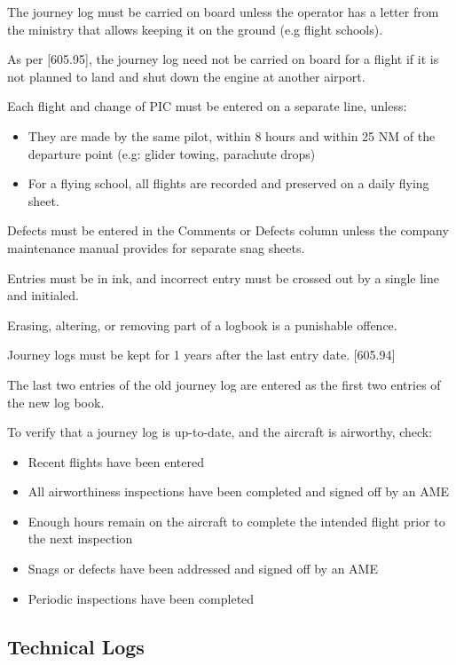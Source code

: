 \documentclass[12pt,letterpaper]{article}
\begin{document}
    The journey log must be carried on board unless the operator has a letter from the ministry that allows keeping it on the ground (e.g flight schools).
    
    As per [605.95], the journey log need not be carried on board for a flight if it is not planned to land and shut down the engine at another airport.
    
    Each flight and change of PIC must be entered on a separate line, unless:
    \begin{itemize}
        \item They are made by the same pilot, within 8 hours and within 25 NM of the departure point (e.g: glider towing, parachute drops)
        \item For a flying school, all flights are recorded and preserved on a daily flying sheet.
    \end{itemize}
    
    Defects must be entered in the Comments or Defects column unless the company maintenance manual provides for separate snag sheets.
    
    Entries must be in ink, and incorrect entry must be crossed out by a single line and initialed.
    
    Erasing, altering, or removing part of a logbook is a punishable offence.
    
    Journey logs must be kept for 1 years after the last entry date. [605.94]
    
    The last two entries of the old journey log are entered as the first two entries of the new log book.
    
    To verify that a journey log is up-to-date, and the aircraft is airworthy, check:
    \begin{itemize}
        \item Recent flights have been entered
        \item All airworthiness inspections have been completed and signed off by an AME
        \item Enough hours remain on the aircraft to complete the intended flight prior to the next inspection
        \item Snags or defects have been addressed and signed off by an AME
        \item Periodic inspections have been completed
    \end{itemize}
    
    \subsection{Technical Logs}
    
\end{document}
